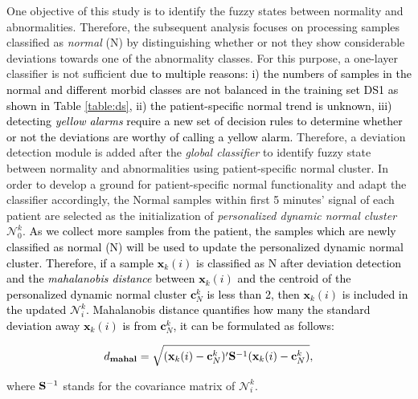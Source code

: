 One objective of this study is to identify the fuzzy states between normality and abnormalities. Therefore, the subsequent analysis focuses on processing samples classified as \textit{normal} (N) 
by distinguishing whether or not they show considerable deviations towards one of the abnormality classes. For this purpose, a one-layer classifier is not sufficient \textcolor{black}{due to multiple reasons: i) the numbers of samples in the normal and different morbid classes are not balanced in the training set DS1 as shown in Table \ref{table:ds}, ii) the patient-specific normal trend is unknown, iii) detecting \textit{yellow alarms} require a new set of decision rules to determine whether or not the deviations are worthy of calling a yellow alarm.} Therefore, a deviation detection module is added after the \textit{global classifier} to identify fuzzy state between normality and abnormalities %
using patient-specific normal cluster. In order to develop a ground for patient-specific normal functionality and adapt the classifier accordingly, the Normal samples within first 5 minutes' signal of each patient are selected as the initialization of \textit{personalized dynamic normal cluster} $\mathcal{N}_0^k$. \textcolor{black}{As we collect more samples from the patient, the samples which are newly classified as normal (N) will be used to update the personalized dynamic normal cluster. Therefore, if a sample $\mathbf{x}_k(i)$ is classified as N after deviation detection and the \textit{mahalanobis distance} between $\mathbf{x}_k(i)$ and the centroid of the personalized dynamic normal cluster $\mathbf{c}^k_N$ is less than 2, then $\mathbf{x}_k(i)$ is included in the updated $\mathcal{N}_i^k$. Mahalanobis distance quantifies how many the standard deviation away $\mathbf{x}_k(i)$ is from $\mathbf{c}^k_N$, it can be formulated as follows:}

\begin{align}
d_{\mathbf{mahal}} = \sqrt{ (\mathbf{x}_k(i)- \mathbf{c}^k_N)' {\rm \bf S}^{-1} (\mathbf{x}_k(i) - \mathbf{c}^k_N) },
\end{align}

where ${\rm \bf S}^{-1}$ stands for the covariance matrix of $\mathcal{N}_i^k$.


